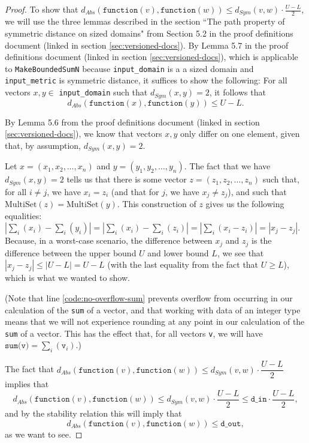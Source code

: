 \documentclass[11pt,a4paper]{article}
\theoremstyle{definition}
\newcommand{\MultiSet}{\mathrm{MultiSet}}
\newcommand{\din}{\texttt{d\_in}}
\newcommand{\dout}{\texttt{d\_out}}
\newcommand{\function}{\texttt{function}}
\begin{document}
\begin{proof}
    
    To show that $d_{Abs}(\function(v), \function(w)) \leq d_{Sym}(v, w) \cdot \frac{U-L}{2}$, we will use the three lemmas described in the section ``The path property of symmetric distance on sized domains" from Section 5.2 in the proof definitions document (linked in section \ref{sec:versioned-docs}). By Lemma 5.7 in the proof definitions document (linked in section \ref{sec:versioned-docs}), which is applicable to \texttt{MakeBoundedSumN} because \texttt{input\_domain} is a a sized domain and \texttt{input\_metric} is symmetric distance, it suffices to show the following: For all vectors $x, y \in$ \texttt{input\_domain} such that $d_{Sym}(x, y) = 2$, it follows that 
    \[
    d_{Abs}(\texttt{function}(x), \texttt{function}(y)) \leq U-L.
    \]
    
    By Lemma 5.6 from the proof definitions document (linked in section \ref{sec:versioned-docs}), we know that vectors $x, y$ only differ on one element, given that, by assumption, $d_{Sym}(x, y) = 2$.
    
    Let $x = (x_1,x_2,\ldots,x_n)$ and $y = (y_1,y_2,\ldots,y_n)$. The fact that we have $d_{Sym}(x, y) = 2$ tells us that there is some vector $z = (z_1,z_2,\ldots,z_n)$ such that, for all $i\neq j$, we have $x_i=z_i$ (and that for $j$, we have $x_j \neq z_j$), and such that $\MultiSet(z)=\MultiSet(y)$. This construction of $z$ gives us the following equalities: $|\sum_i(x_i) - \sum_i(y_i)| = |\sum_i(x_i)-\sum_i(z_i)| = |\sum_i(x_i-z_i)| = |x_j-z_j|$. Because, in a worst-case scenario, the difference between $x_j$ and $z_j$ is the difference between the upper bound $U$ and lower bound $L$, we see that $|x_j-z_j|\leq |U-L| = U-L$ (with the last equality from the fact that $U\geq L$), which is what we wanted to show.
    
    (Note that line \ref{code:no-overflow-sum} prevents overflow from occurring in our calculation of the \texttt{sum} of a vector, and that working with data of an integer type means that we will not experience rounding at any point in our calculation of the \texttt{sum} of a vector. This has the effect that, for all vectors \texttt{v}, we will have $\texttt{sum(v)} = \sum_i(\texttt{v}_i)$.)
    
    
    
    
    The fact that $d_{Abs}(\function(v), \function(w)) \leq d_{Sym}(v, w) \cdot \dfrac{U-L}{2}$ implies that
    \begin{equation}\label{eq:abs1}
        d_{Abs}(\function(v), \function(w)) \leq d_{Sym}(v, w) \cdot \dfrac{U-L}{2} \leq \din \cdot \dfrac{U-L}{2},
    \end{equation}
    and by the stability relation this will imply that
    \begin{equation}\label{eq:abs2}
        d_{Abs}(\function(v), \function(w)) \leq \dout,
    \end{equation}
    as we want to see. 
\end{proof}
\end{document}
